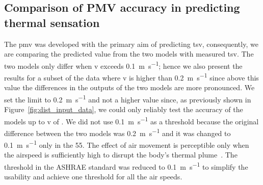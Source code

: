 \subsection{Comparison of PMV accuracy in predicting thermal sensation}\label{subsec:model-accuracy-comparison-in-predicting-thermal-sensation}
The \ac{pmv} was developed with the primary aim of predicting \ac{tsv}, consequently, we are comparing the predicted value from the two models with measured \ac{tsv}.
The two models only differ when \ac{v} exceeds \qty{0.1}{\m\per\s};
hence we also present the results for a subset of the data where \ac{v} is higher than \qty{0.2}{\m\per\s} since above this value the differences in the outputs of the two models are more pronounced.
We set the limit to \qty{0.2}{\m\per\s} and not a higher value since, as previously shown in Figure~\ref{fig:dist_input_data}, we could only reliably test the accuracy of the models up to \ac{v} of .
We did not use \qty{0.1}{\m\per\s} as a threshold because the original difference between the two models was \qty{0.2}{\m\per\s} and it was changed to \qty{0.1}{\m\per\s} only in the \gls{55}.
The effect of air movement is perceptible only when the airspeed is sufficiently high to disrupt the body's thermal plume~\cite{zukowska_impact_2012}.
The threshold in the ASHRAE standard was reduced to \qty{0.1}{\m\per\s} to simplify the usability and achieve one threshold for all the air speeds.
